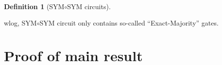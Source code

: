 \documentclass[a4paper, 11pt]{article}
\theoremstyle{plain}
\theoremstyle{definition}
\newtheorem{definition}[theorem]{Definition}
\theoremstyle{remark}
\newcommand{\ssym}{\textsf{SYM$\circ$SYM}}%
\begin{document}
\begin{definition}[\ssym{} circuits]
\end{definition}

wlog, \ssym{} circuit only contains so-called ``Exact-Majority'' gates.

\section{Proof of main result}




\end{document}
